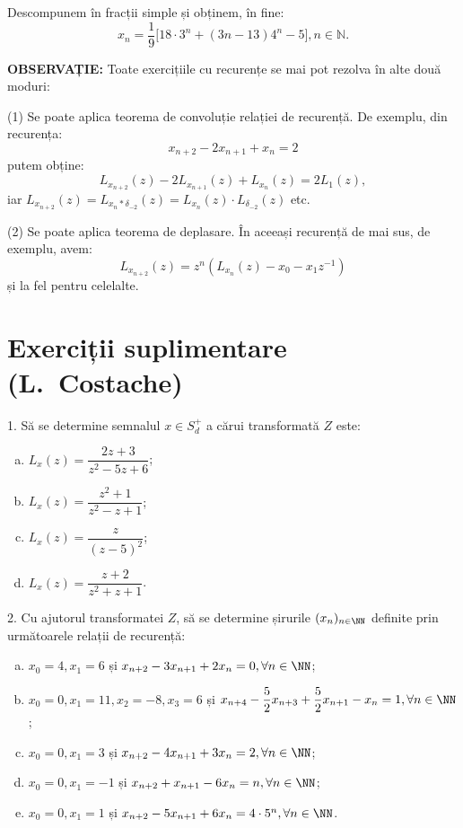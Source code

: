 Descompunem în fracții simple și obținem, în fine: 
\[
    x_n = \dfrac{1}{9} \big[ 18 \cdot 3^n + (3n - 13) 4^n - 5 \big], 
    n \in \mathbb{N}.
\]

\textbf{OBSERVAȚIE:} Toate exercițiile cu recurențe se mai pot rezolva în alte
două moduri:

(1) Se poate aplica teorema de convoluție relației de recurență. De exemplu,
din recurența:
\[
    x_{n + 2} - 2x_{n + 1} + x_n = 2
\]
putem obține:
\[
    L_{x_{n+2}}(z) - 2L_{x_{n + 1}}(z) + L_{x_n}(z) = 2L_1(z),
\]
iar $ L_{x_{n+2}}(z) = L_{x_n \ast \delta_{-2}}(z) = L_{x_n}(z) \cdot L_{\delta_{-2}}(z) $ etc.

(2) Se poate aplica teorema de deplasare. În aceeași recurență de mai sus,
de exemplu, avem:
\[
    L_{x_{n+2}}(z) = z^n \left( L_{x_n}(z) - x_0 - x_1 z^{-1} \right)
\]
și la fel pentru celelalte.

\section{Exerciții suplimentare (L.\ Costache)}

1. Să se determine semnalul $ x \in S_d^+ $ a cărui transformată $ Z $ este:
\begin{enumerate}[(a)]
    \item $ L_x(z) = \dfrac{2z+3}{z^2 - 5z + 6} $;
    \item $ L_x(z) = \dfrac{z^2 + 1}{z^2 - z + 1} $;
    \item $ L_x(z) = \dfrac{z}{(z - 5)^2} $;
    \item $ L_x(z) = \dfrac{z + 2}{z^2 + z + 1} $.
\end{enumerate}

\vspace{0.3cm}

2. Cu ajutorul transformatei $ Z $, să se determine șirurile $ (x_n)_{n \in \NN} $
definite prin următoarele relații de recurență:

\begin{enumerate}[(a)]
    \item $ x_0 = 4, x_1 = 6 $ și $ x_{n+2} - 3x_{n+1} + 2x_n = 0, \forall n \in \NN $;
    \item $ x_0 = 0, x_1 = 11, x_2 = -8, x_3 = 6 $ și $ x_{n+4} - \dfrac{5}{2} x_{n+3} + \dfrac{5}{2} x_{n+1} - x_n = 1, \forall n \in \NN $;
    \item $ x_0 = 0, x_1 = 3 $ și $ x_{n+2} - 4x_{n+1} + 3x_n = 2, \forall n \in \NN $;
    \item $ x_0 = 0, x_1 = -1 $ și $ x_{n + 2} + x_{n + 1} - 6x_n = n, \forall n \in \NN $;
    \item $ x_0 = 0, x_1 = 1 $ și $ x_{n + 2} - 5x_{n+1} + 6x_n = 4 \cdot 5^n, \forall n \in \NN $.
\end{enumerate}